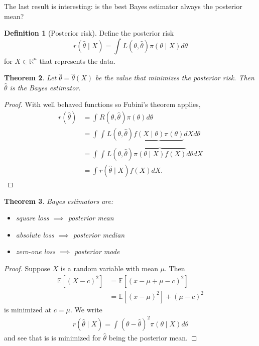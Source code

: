 \documentclass{tufte-handout}
\newcommand*\R{\mathbb{R}}
\newcommand*\E{\mathbb{E}}
\newtheorem{thm}{Theorem}[subsection]
\theoremstyle{definition}
\newtheorem{defn}[thm]{Definition}
\begin{document}
The last result is interesting: is the best Bayes estimator always the posterior mean?

\begin{defn}[Posterior risk]
	Define the posterior risk \[
		r(\hat{\theta} \mid X) = \int_{}^{} L(\theta, \hat{\theta}) \pi(\theta \mid X) d\theta
	\] for $X \in \R^n$ that represents the data.
\end{defn}

\begin{thm}
	Let $\hat{\theta} = \hat{\theta}(X)$ be the value that minimizes the posterior risk. Then $\hat{\theta}$ is the Bayes estimator.
\end{thm}
\begin{proof}
	With well behaved functions so Fubini's theorem applies,
	\begin{align*}
		r(\hat{\theta}) &= \int_{}^{} R(\theta, \hat{\theta})\pi(\theta)d\theta  \\
		&= \int_{}^{} \int_{}^{} L(\theta, \hat{\theta}) \underbrace{f(X\mid \theta) \pi(\theta)}_{} dXd\theta		  \\
		&= \int_{}^{} \int_{}^{} L(\theta, \hat{\theta}) \overbrace{\pi(\theta \mid X) f(X) }^{} d\theta dX \\
		&= \int_{}^{} r(\hat{\theta} \mid X) f(X) dX 
	.\end{align*}
\end{proof}

\begin{thm}
	Bayes estimators are:
	\begin{itemize}
		\item square loss $\implies$ posterior mean 
		\item absolute loss $\implies$ posterior median 
		\item zero-one loss $\implies$ posterior mode
	\end{itemize}
\end{thm}
\begin{proof}
	 Suppose $X$ is a random variable with mean $\mu$. Then 
	\begin{align*}
		\E\left[\left( X-c \right)^2\right] &= \E\left[\left( x-\mu + \mu - c \right)^2\right] \\
		&= \E\left[\left( x-\mu \right)^2\right] + \left( \mu-c \right)^2
	\end{align*} 
	is minimized at $c=\mu$.
	We write
	\begin{align*}
		r(\hat{\theta}\mid X) = \int_{}^{} \left( \theta - \hat{\theta} \right)^2 \pi(\theta \mid X)d\theta 
	\end{align*}
	and see that is is minimized for $\hat{\theta}$ being the posterior mean.
\end{proof}

\end{document}
